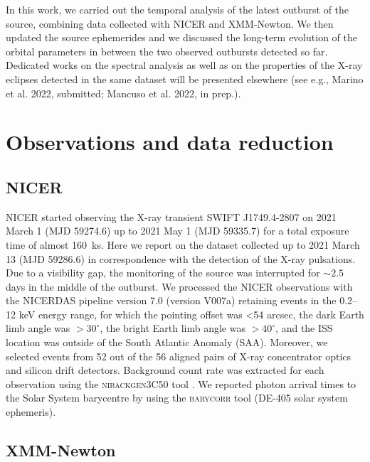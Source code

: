 \documentclass[fleqn,usenatbib]{mnras}
\newcommand{\swiftj}{SWIFT J1749.4-2807}
\newcommand{\nicer}{NICER}
\newcommand{\xmm}{XMM-Newton}
\begin{document}
In this work, we carried out the temporal analysis of the latest outburst of the source, combining data collected with \nicer{} and \xmm{}. We then updated the source ephemerides and we discussed the long-term evolution of the orbital parameters in between the two observed outbursts detected so far. Dedicated works on the spectral analysis as well as on the properties of the X-ray eclipses detected in the same dataset will be presented elsewhere (see e.g., Marino et al. 2022, submitted; Mancuso et al. 2022, in prep.).

\section{Observations and data reduction}


\subsection{NICER}

NICER \citep{Gendreau:2012vf} started observing the X-ray transient \swiftj{} on 2021 March 1 (MJD 59274.6) up to 2021 May 1 (MJD 59335.7) for a total exposure time of almost 160~ks. Here we report on the dataset collected up to 2021 March 13 (MJD 59286.6) in correspondence with the detection of the X-ray pulsations. Due to a visibility gap, the monitoring of the source was interrupted for $\sim2.5$ days in the middle of the outburst. We processed the NICER observations with the \textsc{NICERDAS} pipeline version 7.0 (version V007a) retaining events in the 0.2--12 keV energy range, for which the pointing offset was <54 arcsec, the dark Earth limb angle was $>30^\circ$, the bright Earth limb angle was $>40^\circ$, and the ISS location was outside of the South Atlantic Anomaly (SAA). Moreover, we selected events from 52 out of the 56 aligned pairs of X-ray concentrator optics and silicon drift detectors. Background count rate was extracted for each observation using the \textsc{nibackgen3C50} tool \citep{Remillard:2021tt}. We reported photon arrival times to the Solar System barycentre by using the \textsc{barycorr} tool (DE-405 solar system ephemeris).   


\subsection{XMM-Newton}
\end{document}
